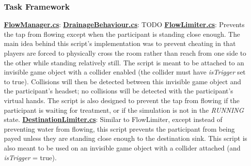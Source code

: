 \documentclass{article}
\begin{document}
\subsubsection{Task Framework} %
\href{https://bit.ly/2WrbyxT}{\textbf{FlowManager.cs}}: \newline \newline 
\href{https://bit.ly/2YtMEjd}{\textbf{DrainageBehaviour.cs}}: TODO  \newline \newline 
\href{https://bit.ly/2TUX1h4}{\textbf{FlowLimiter.cs}}: Prevents the tap from flowing except when the participant is standing close enough. The main idea behind this script's implementation was to prevent cheating in that players are forced to physically cross the room rather than reach from one side to the other while standing relatively still. The script is meant to be attached to an invisible game object with a collider enabled (the collider must have \textit{isTrigger} set to true). Collisions will then be detected between this invisible game object and the participant's headset; no collisions will be detected with the participant's virtual hands. The script is also designed to prevent the tap from flowing if the participant is waiting for treatment, or if the simulation is not in the \textit{RUNNING} state. \newline \newline
\href{https://bit.ly/2JGhr8M}{\textbf{DestinationLimiter.cs}}: Similar to FlowLimiter, except instead of preventing water from flowing, this script prevents the participant from being payed unless they are standing close enough to the destination sink. This script is also meant to be used on an invisible game object with a collider attached (and \textit{isTrigger} = true). 
\end{document}
